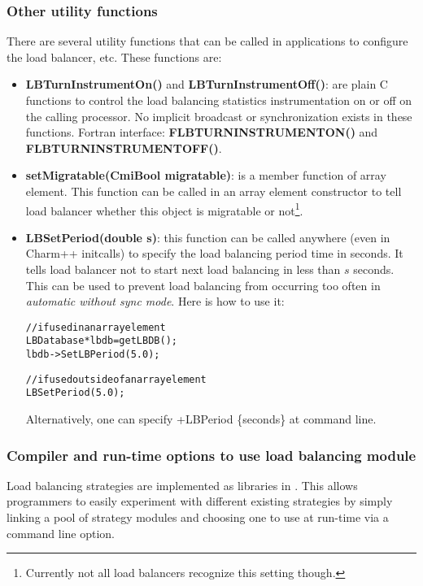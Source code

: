 \subsubsection{Other utility functions}

There are several utility functions that can be called in applications to
configure the load balancer, etc. These functions are:

\begin{itemize}
\item {\bf LBTurnInstrumentOn()} and {\bf LBTurnInstrumentOff()}: are plain C
      functions to control the load balancing statistics instrumentation
      on or off on the calling processor. No implicit broadcast or 
      synchronization exists in these functions.
      Fortran interface: {\bf FLBTURNINSTRUMENTON()} and {\bf FLBTURNINSTRUMENTOFF()}.
\item {\bf setMigratable(CmiBool migratable)}: is a member function of array
      element. This function can be called 
      in an array element constructor to tell load balancer whether this object
      is migratable or not\footnote{Currently not all load balancers 
      recognize this setting though.}.
\item {\bf LBSetPeriod(double s)}: this function can be called
      anywhere (even in Charm++ initcalls) to specify 
      the load balancing period time in seconds. 
      It tells load balancer not to start next 
      load balancing in less than $s$ seconds. This can be used to prevent 
      load balancing from occurring too often in 
      {\em automatic without sync mode}. Here is how to use it:
      \begin{alltt}
// if used in an array element
LBDatabase *lbdb = getLBDB();
lbdb->SetLBPeriod(5.0);

// if used outside of an array element
LBSetPeriod(5.0);
\end{alltt}
      Alternatively, one can specify +LBPeriod \{seconds\} at command line.
\end{itemize}

\subsubsection{Compiler and run-time options to use load balancing module}

\label{lbOption}

Load balancing strategies are implemented as libraries in \charmpp{}. This
allows programmers to easily experiment with different existing strategies 
by simply linking a pool of strategy modules and choosing
one to use at run-time via a command line option.

